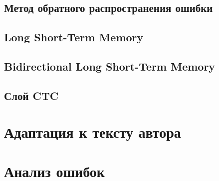\subsection{Метод обратного распространения ошибки}
\subsection{Long Short-Term Memory}
\subsection{Bidirectional Long Short-Term Memory}
\subsection{Слой CTC}

\section{Адаптация к тексту автора}

\section{Анализ ошибок}



